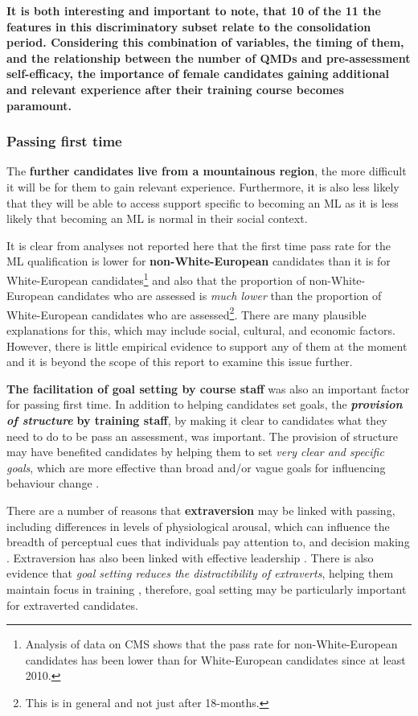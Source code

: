 \documentclass[a4paper,]{book}
\begin{document}
\textbf{It is both interesting and important to note, that 10 of the 11 the features in this discriminatory subset relate to the consolidation period. Considering this combination of variables, the timing of them, and the relationship between the number of QMDs and pre-assessment self-efficacy, the importance of female candidates gaining additional and relevant experience after their training course becomes paramount.}

\hypertarget{passing-first-time-2}{%
\subsubsection{Passing first time}\label{passing-first-time-2}}

The \textbf{further candidates live from a mountainous region}, the more difficult it will be for them to gain relevant experience. Furthermore, it is also less likely that they will be able to access support specific to becoming an ML as it is less likely that becoming an ML is normal in their social context.

It is clear from analyses not reported here that the first time pass rate for the ML qualification is lower for \textbf{non-White-European} candidates than it is for White-European candidates\footnote{Analysis of data on CMS shows that the pass rate for non-White-European candidates has been lower than for White-European candidates since at least 2010.} and also that the proportion of non-White-European candidates who are assessed is \emph{much lower} than the proportion of White-European candidates who are assessed\footnote{This is in general and not just after 18-months.}. There are many plausible explanations for this, which may include social, cultural, and economic factors. However, there is little empirical evidence to support any of them at the moment and it is beyond the scope of this report to examine this issue further.

\textbf{The facilitation of goal setting by course staff} was also an important factor for passing first time. In addition to helping candidates set goals, the \emph{\textbf{provision of structure}} \textbf{by training staff}, by making it clear to candidates what they need to do to be pass an assessment, was important. The provision of structure may have benefited candidates by helping them to set \emph{very clear and specific goals}, which are more effective than broad and/or vague goals for influencing behaviour change \citep{Gould2005}.

There are a number of reasons that \textbf{extraversion} may be linked with passing, including differences in levels of physiological arousal, which can influence the breadth of perceptual cues that individuals pay attention to, and decision making \citep{Hardy1996}. Extraversion has also been linked with effective leadership \citep{Judge2002}. There is also evidence that \emph{goal setting reduces the distractibility of extraverts}, helping them maintain focus in training \citep{Woodman2010a}, therefore, goal setting may be particularly important for extraverted candidates.
\end{document}
